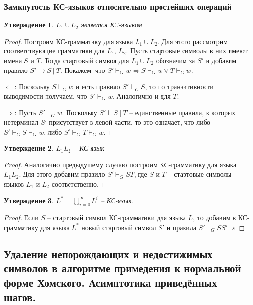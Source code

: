 \documentclass[a4paper,12pt]{article}
\theoremstyle{plain}
\newtheorem{proposition}{Утверждение}[subsection]
\theoremstyle{definition}
\theoremstyle{remark}
\begin{document}
\subsubsection*{Замкнутость КС-языков относительно простейших операций}
\begin{proposition}
	$L_1 \cup L_2$ является КС-языком
\end{proposition}

\begin{proof}
	Построим КС-грамматику для языка $L_1 \cup L_2$. Для этого рассмотрим соответствующие грамматики для $L_1,\, L_2$. Пусть стартовые символы в них имеют имена $S$ и $T$. Тогда стартовый символ для $L_1 \cup L_2$ обозначим за $S'$ и добавим правило $S' \to S \:|\: T$. Покажем, что $S' \vdash_G w \Leftrightarrow S \vdash_G w \lor T \vdash_G w$.

	$\Leftarrow$: Поскольку $S \vdash_G w$ и есть правило $S' \vdash_G S$, то по транзитивности выводимости получаем, что $S' \vdash_G w$. Аналогично и для $T$.

	$\Rightarrow$: Пусть $S' \vdash_G w$. Поскольку $S' \vdash S \:|\: T$ -- единственные правила, в которых нетерминал $S'$ присутствует в левой части, то это означает, что либо $S' \vdash_G S \vdash_G w$, либо $S' \vdash_G T \vdash_G w$.
\end{proof}

\begin{proposition}
	$L_1L_2$ -- КС-язык
\end{proposition}

\begin{proof}
	Аналогично предыдущему случаю построим КС-грамматику для языка $L_1L_2$. Для этого добавим правило $S' \vdash_G ST$, где $S$ и $T$ -- стартовые символы языков $L_1$ и $L_2$ соответственно.
\end{proof}

\begin{proposition}
	$L^* = \bigcup_{i = 0}^\infty L^i$ -- КС-язык.
\end{proposition}

\begin{proof}
	Если $S$ -- стартовый символ КС-грамматики для языка $L$, то добавим в КС-грамматику для языка $L^*$ новый стартовый символ $S'$ и правила $S' \vdash_G SS' \:|\: \varepsilon$
\end{proof}

\subsection{Удаление непорождающих и недостижимых символов в алгоритме примедения к нормальной форме Хомского. Асимптотика приведённых шагов.}
\end{document}
